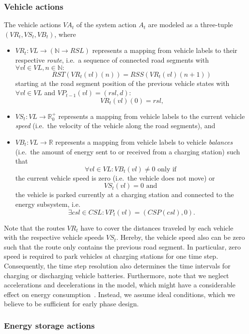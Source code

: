 \subsubsection{Vehicle actions}
\label{actions_vehicles}

The vehicle actions $VA_t$ of the system action $A_t$ are modeled as a three-tuple $(VR_t, VS_t, VB_t)$, where
\begin{itemize}
	\item $VR_t: VL \rightarrow (\mathbb{N} \rightarrow RSL)$ represents a mapping from vehicle labels to their respective \textit{route}, i.e.\ a sequence of connected road segments with $\forall vl \in VL, n \in \mathbb{N}:$
	\[
		RST(VR_t(vl)(n)) = RSS(VR_t(vl)(n + 1))
	\]
	starting at the road segment position of the previous vehicle states with $\forall vl \in VL$ and $VP_{t-1}(vl) = (rsl, d):$
	\[
		VR_t(vl)(0) = rsl \textrm{,}
	\]
	\item $VS_t: VL \rightarrow \mathbb{R}_0^+$ represents a mapping from vehicle labels to the current vehicle \textit{speed} (i.e.\ the velocity of the vehicle along the road segments), and
	\item $VB_t: VL \rightarrow \mathbb{R}$ represents a mapping from vehicle labels to vehicle \textit{balances} (i.e.\ the amount of energy sent to or received from a charging station) such that
	\[
		\forall vl \in VL: VB_t(vl) \neq 0 \textrm{ only if }
	\]
	the current vehicle speed is zero (i.e.\ the vehicle does not move) or
	\[
		 VS_t(vl) = 0 \textrm{ and }
	\]
	the vehicle is parked currently at a charging station and connected to the energy subsystem, i.e.\
	\[
		\exists csl \in CSL: VP_t(vl) = (CSP(csl), 0) \textrm{.}
	\]
\end{itemize}
Note that the routes $VR_t$ have to cover the distances traveled by each vehicle with the respective vehicle speeds $VS_t$. Hereby, the vehicle speed also can be zero such that the route only contains the previous road segment. In particular, zero speed is required to park vehicles at charging stations for one time step. Consequently, the time step resolution also determines the time intervals for charging or discharging vehicle batteries. Furthermore, note that we neglect accelerations and decelerations in the model, which might have a considerable effect on energy consumption~\cite{?}. Instead, we assume ideal conditions, which we believe to be sufficient for early phase design.

\subsubsection{Energy storage actions}
\label{actions_storages}


